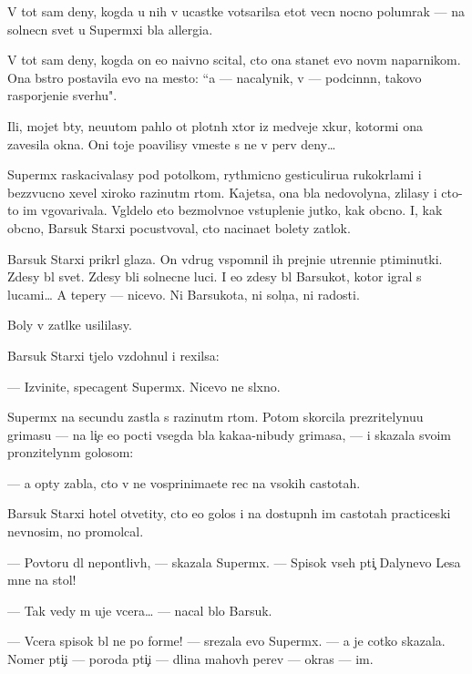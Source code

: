 \documentclass[12pt]{book}
\begin{document}
V tot sam{\yi}{\y} deny, kogda u nih v ucastke votsarilsa etot vecn{\yi}{\y} nocno{\y} polumrak — na solnecn{\yi}{\y} svet u Superm{\yi}xi b{\yi}la allergi{\y}a.

V tot sam{\yi}{\y} deny, kogda on {\y}e{\x}o naivno scital, cto ona stanet {\y}evo nov{\yi}m naparnikom. Ona b{\yi}stro postavila {\y}evo na mesto: ``{\Y}a — nacalynik, v{\yi} — podcin{\e}nn{\yi}{\y}, takovo raspor{\ia}jeni{\y}e sverhu".

Ili, mojet b{\yi}ty, neu{\y}utom pahlo ot plotn{\yi}h xtor iz medvej{\y}e{\y} xkur{\yi}, ko\-to\-r{\yi}\-mi ona zavesila okna. Oni toje po{\y}avilisy vmeste s ne{\y} v perv{\yi}{\y} deny…

Superm{\yi}x raskacivalasy pod potolkom, rythmicno gesticuliru{\y}a ru\-ko\-kr{\yi}\-l{\y}a\-mi i bezzvucno xevel{\ia} xiroko razinut{\yi}m rtom. Kajetsa, ona b{\yi}la nedovolyna, zlilasy i cto-to im v{\yi}govarivala. V{\yi}gl{\ia}delo eto bezmolvno{\y}e v{\yi}stupleni{\y}e jutko, kak ob{\yi}cno. I, kak ob{\yi}cno, Barsuk Starxi{\y} pocustvoval, cto nacina{\y}et bolety zat{\yi}lok.

Barsuk Starxi{\y} prikr{\yi}l glaza. On vdrug vspomnil ih prejni{\y}e utrenni{\y}e p{\ia}\-ti\-mi\-nut\-ki. Zdesy b{\yi}l svet. Zdesy b{\yi}li solnecn{\yi}{\y}e luci. I {\y}e{\x}o zdesy b{\yi}l Barsukot, kotor{\yi}{\y} igral s lucami… A tepery — nicevo. Ni Barsukota, ni soln{\c}a, ni radosti.

Boly v za\-t{\yi}l\-ke usililasy.

Barsuk Starxi{\y} t{\ia}jelo vzdohnul i rexilsa:

— Izvinite, specagent Superm{\yi}x. Nicevo ne sl{\yi}xno.

Superm{\yi}x na secundu zast{\yi}la s razinut{\yi}m rtom. Potom skorcila pre\-zri\-tely\-nu\-{\y}u grimasu — na li{\c}e {\y}e{\y}o pocti vsegda b{\yi}la kaka{\y}a-nibudy grimasa, — i skazala svo{\y}im pronzitelyn{\yi}m golosom:

— {\Y}a op{\ia}ty zab{\yi}la, cto v{\yi} ne vosprinima{\y}ete rec na v{\yi}sokih castotah.

Barsuk Starxi{\y} hotel otvetity, cto {\y}e{\y}o golos i na dostupn{\yi}h im castotah practiceski nev{\yi}nosim, no promolcal.

— Povtor{\ia}{\y}u dl{\ia} nepon{\ia}tliv{\yi}h, — skazala Superm{\yi}x. — Spisok vseh pti{\c} Dalynevo Lesa mne na stol!

— Tak vedy m{\yi} uje vcera… — nacal b{\yi}lo Barsuk.

— Vcera spisok b{\yi}l ne po forme! — srezala {\y}evo Superm{\yi}x. — {\Y}a je cotko skazala. Nomer pti{\c}i — poroda pti{\c}i — dlina mahov{\yi}h per{\y}ev — okras — im{\ia}.
\end{document}
